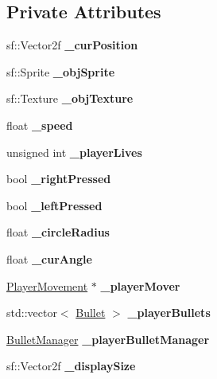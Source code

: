 \subsection*{Private Attributes}
\begin{DoxyCompactItemize}
\item 
\mbox{\label{class_player_a3eee43afb7a372baca390749259949f8}} 
sf\+::\+Vector2f {\bfseries \+\_\+cur\+Position}
\item 
\mbox{\label{class_player_a6b0a2f6db37865415e5855868d469a15}} 
sf\+::\+Sprite {\bfseries \+\_\+obj\+Sprite}
\item 
\mbox{\label{class_player_a82b80133ff2c62d50718dca10b004be7}} 
sf\+::\+Texture {\bfseries \+\_\+obj\+Texture}
\item 
\mbox{\label{class_player_a2058005a9cb8d0ee1930178ab5965ac1}} 
float {\bfseries \+\_\+speed}
\item 
\mbox{\label{class_player_a3ac2d7fa51966139efd25bc1b8552208}} 
unsigned int {\bfseries \+\_\+player\+Lives}
\item 
\mbox{\label{class_player_a8aff890e78e0f13a19d412e1a1aa0c19}} 
bool {\bfseries \+\_\+right\+Pressed}
\item 
\mbox{\label{class_player_a968f709b83915a6805d2f194b753e5a4}} 
bool {\bfseries \+\_\+left\+Pressed}
\item 
\mbox{\label{class_player_abfba97cad280b5f31cb10d5e3df35be3}} 
float {\bfseries \+\_\+circle\+Radius}
\item 
\mbox{\label{class_player_abc54196e9192b4e91542f8edbafecf4b}} 
float {\bfseries \+\_\+cur\+Angle}
\item 
\mbox{\label{class_player_ae56c992348833fc0cf154e55b2b348f8}} 
\hyperlink{class_player_movement}{Player\+Movement} $\ast$ {\bfseries \+\_\+player\+Mover}
\item 
\mbox{\label{class_player_ab261cdf1236f7e794f9b405409315419}} 
std\+::vector$<$ \hyperlink{class_bullet}{Bullet} $>$ {\bfseries \+\_\+player\+Bullets}
\item 
\mbox{\label{class_player_a89d5ba57b7de854e218b0917bfa5029d}} 
\hyperlink{class_bullet_manager}{Bullet\+Manager} {\bfseries \+\_\+player\+Bullet\+Manager}
\item 
\mbox{\label{class_player_a2782ada46f92cfdd3d68bcacd5253333}} 
sf\+::\+Vector2f {\bfseries \+\_\+display\+Size}
\end{DoxyCompactItemize}
